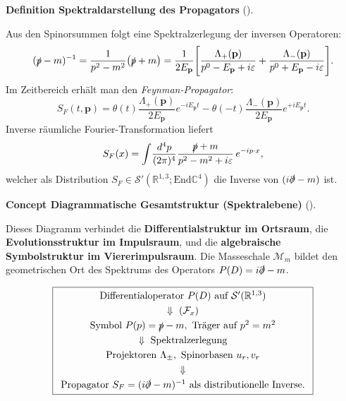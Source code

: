 \documentclass[10pt, letterpaper]{article}
\newcommand{\R}{\mathbb{R}}
\newcommand{\C}{\mathbb{C}}
\newcommand{\End}{\mathrm{End}}
\newcommand{\CustomHeading}[3]{%
  \par\medskip\noindent%
  \textbf{#1 #2} \textnormal{(#3)}.\enskip%
}
\newenvironment{DEF}[2]{\begin{unitbox}\CustomHeading{Definition}{#1}{#2}}{\end{unitbox}}
\newenvironment{CONC}[2]{\begin{unitbox}\CustomHeading{Concept}{#1}{#2}}{\end{unitbox}}
\begin{document}
\begin{DEF}{Spektraldarstellung des Propagators}{}
Aus den Spinorsummen folgt eine Spektralzerlegung der inversen Operatoren:
\[
(\slashed{p}-m)^{-1}
=\frac{1}{p^2-m^2}
\big(\slashed{p}+m\big)
=\frac{1}{2E_{\mathbf{p}}}
\Bigg[
\frac{\Lambda_+(\mathbf{p})}{p^0-E_{\mathbf{p}}+i\varepsilon}
+\frac{\Lambda_-(\mathbf{p})}{p^0+E_{\mathbf{p}}-i\varepsilon}
\Bigg].
\]
Im Zeitbereich erhält man den \emph{Feynman-Propagator}:
\[
S_F(t,\mathbf{p})
=\theta(t)\frac{\Lambda_+(\mathbf{p})}{2E_{\mathbf{p}}}e^{-iE_{\mathbf{p}}t}
-\theta(-t)\frac{\Lambda_-(\mathbf{p})}{2E_{\mathbf{p}}}e^{+iE_{\mathbf{p}}t}.
\]
Inverse räumliche Fourier-Transformation liefert
\[
S_F(x)
=\int\!\frac{d^4p}{(2\pi)^4}
\frac{\slashed{p}+m}{p^2-m^2+i\varepsilon}\,e^{-ip\cdot x},
\]
welcher als Distribution $S_F\in\mathcal{S}'(\R^{1,3};\End\C^4)$ die Inverse von
$(i\slashed{\partial}-m)$ ist.
\end{DEF}




\begin{CONC}{Diagrammatische Gesamtstruktur (Spektralebene)}{}
\begin{center}
\end{center}
Dieses Diagramm verbindet die
\textbf{Differentialstruktur im Ortsraum},
die \textbf{Evolutionsstruktur im Impulsraum},
und die \textbf{algebraische Symbolstruktur im Viererimpulsraum}.
Die Masseschale $\mathcal{M}_m$ bildet den geometrischen Ort des Spektrums des Operators
$P(D)=i\slashed{\partial}-m$.

\[
\boxed{
\begin{array}{c}
\text{Differentialoperator } P(D)\text{ auf }\mathcal{S}'(\R^{1,3})\\[3pt]
\Downarrow\ (\mathcal{F}_x)\\[3pt]
\text{Symbol } P(p)=\slashed{p}-m,\ \text{Träger auf } p^2=m^2\\[3pt]
\Downarrow\ \text{Spektralzerlegung}\\[3pt]
\text{Projektoren }\Lambda_\pm,\text{ Spinorbasen }u_r,v_r\\[3pt]
\Downarrow\\[3pt]
\text{Propagator }S_F=(i\slashed{\partial}-m)^{-1}
\ \text{als distributionelle Inverse.}
\end{array}}
\]
\end{CONC}
\end{document}
